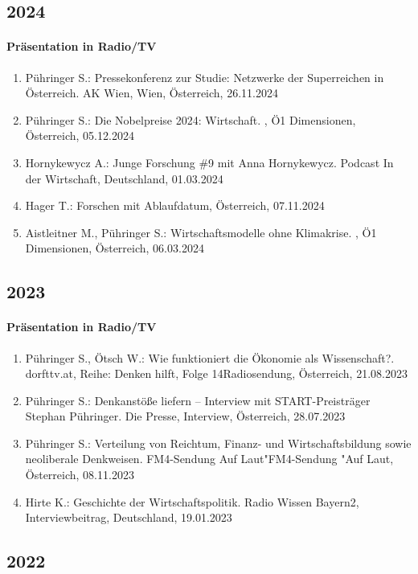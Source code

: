 \subsection*{2024}
\paragraph{Präsentation in Radio/TV}
\begin{enumerate}
	\item Pühringer S.: Pressekonferenz zur Studie: \glqq Netzwerke der Superreichen in Österreich\grqq{}. AK Wien, Wien, Österreich, 26.11.2024
	\item Pühringer S.: Die Nobelpreise 2024: Wirtschaft. , Ö1 Dimensionen, Österreich, 05.12.2024
	\item Hornykewycz A.: Junge Forschung \#9 mit Anna Hornykewycz. Podcast \glqq In der Wirtschaft\grqq{}, Deutschland, 01.03.2024
	\item Hager T.: Forschen mit Ablaufdatum, Österreich, 07.11.2024
	\item Aistleitner M., Pühringer S.: Wirtschaftsmodelle ohne Klimakrise. , Ö1 Dimensionen, Österreich, 06.03.2024
\end{enumerate}
\subsection*{2023}
\paragraph{Präsentation in Radio/TV}
\begin{enumerate}
	\item Pühringer S., Ötsch W.: Wie funktioniert die Ökonomie als Wissenschaft?. dorfttv.at, Reihe: Denken hilft, Folge 14Radiosendung, Österreich, 21.08.2023
	\item Pühringer S.: Denkanstöße liefern -- Interview mit START-Preisträger Stephan Pühringer. Die Presse, Interview, Österreich, 28.07.2023
	\item Pühringer S.: Verteilung von Reichtum, Finanz- und Wirtschaftsbildung sowie neoliberale Denkweisen. FM4-Sendung \glqq Auf Laut"FM4-Sendung "Auf Laut\grqq{}, Österreich, 08.11.2023
	\item Hirte K.: Geschichte der Wirtschaftspolitik. Radio Wissen Bayern2, Interviewbeitrag, Deutschland, 19.01.2023
\end{enumerate}
\subsection*{2022}
